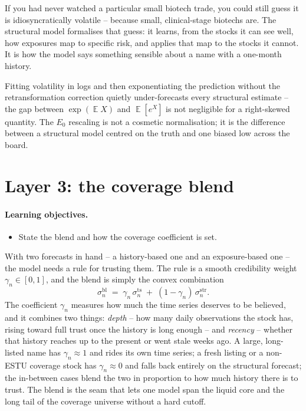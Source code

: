 \documentclass[11pt]{article}
\theoremstyle{definition}
\theoremstyle{plain}
\theoremstyle{remark}
\DeclareMathOperator*{\avg}{\mathbb{E}}
\begin{document}
\begin{intuition}
If you had never watched a particular small biotech trade, you could still guess it is idiosyncratically volatile -- because small, clinical-stage biotechs are. The structural model formalises that guess: it learns, from the stocks it can see well, how exposures map to specific risk, and applies that map to the stocks it cannot. It is how the model says something sensible about a name with a one-month history.
\end{intuition}

\begin{pitfall}
Fitting volatility in logs and then exponentiating the prediction without the retransformation correction quietly under-forecasts every structural estimate -- the gap between $\exp(\avg X)$ and $\avg[e^X]$ is not negligible for a right-skewed quantity. The $E_0$ rescaling is not a cosmetic normalisation; it is the difference between a structural model centred on the truth and one biased low across the board.
\end{pitfall}

\section{Layer 3: the coverage blend}\label{sec:blend}

\paragraph{Learning objectives.}
\begin{itemize}[leftmargin=1.4em,topsep=2pt]
  \item State the blend and how the coverage coefficient is set.
\end{itemize}

With two forecasts in hand -- a history-based one and an exposure-based one -- the model needs a rule for trusting them. The rule is a smooth credibility weight $\gamma_n\in[0,1]$, and the blend is simply the convex combination
\[
\sigma^{\text{bl}}_n \;=\; \gamma_n\,\sigma^{\text{ts}}_n \;+\; (1-\gamma_n)\,\sigma^{\text{str}}_n .
\]
The coefficient $\gamma_n$ measures how much the time series deserves to be believed, and it combines two things: \emph{depth} -- how many daily observations the stock has, rising toward full trust once the history is long enough -- and \emph{recency} -- whether that history reaches up to the present or went stale weeks ago. A large, long-listed name has $\gamma_n\approx 1$ and rides its own time series; a fresh listing or a non-ESTU coverage stock has $\gamma_n\approx 0$ and falls back entirely on the structural forecast; the in-between cases blend the two in proportion to how much history there is to trust. The blend is the seam that lets one model span the liquid core and the long tail of the coverage universe without a hard cutoff.
\end{document}
